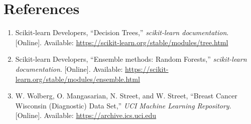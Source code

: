 \documentclass[12pt,a4paper]{article}
\begin{document}
\section{References}
\begin{enumerate}
\item Scikit-learn Developers, ``Decision Trees,'' \textit{scikit-learn documentation}. [Online]. Available: \url{https://scikit-learn.org/stable/modules/tree.html}
\item Scikit-learn Developers, ``Ensemble methods: Random Forests,'' \textit{scikit-learn documentation}. [Online]. Available: \url{https://scikit-learn.org/stable/modules/ensemble.html}
\item W. Wolberg, O. Mangasarian, N. Street, and W. Street, ``Breast Cancer Wisconsin (Diagnostic) Data Set,'' \textit{UCI Machine Learning Repository}. [Online]. Available: \url{https://archive.ics.uci.edu}
\end{enumerate}
\end{document}
